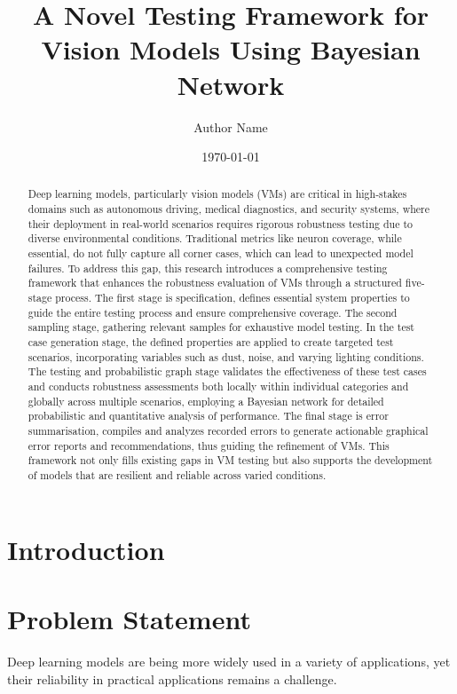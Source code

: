 \documentclass[10pt, conference, a4paper, final]{IEEEtran}
\title{ A Novel Testing Framework for Vision Models Using Bayesian Network}
\author{Author Name}
\date{\today}
\begin{document}
\maketitle

\begin{abstract}

    Deep learning models, particularly vision models (VMs) are critical in high-stakes domains such as autonomous driving, medical diagnostics, and security systems, where their deployment in real-world scenarios requires rigorous robustness testing due to diverse environmental conditions. Traditional metrics like neuron coverage, while essential, do not fully capture all corner cases, which can lead to unexpected model failures. To address this gap, this research introduces a comprehensive testing framework that enhances the robustness evaluation of VMs through a structured five-stage process. The first stage is specification, defines essential system properties to guide the entire testing process and ensure comprehensive coverage. The second sampling stage, gathering relevant samples for exhaustive model testing. In the test case generation stage, the defined properties are applied to create targeted test scenarios, incorporating variables such as dust, noise, and varying lighting conditions. The testing and probabilistic graph stage validates the effectiveness of these test cases and conducts robustness assessments both locally within individual categories and globally across multiple scenarios, employing a Bayesian network for detailed probabilistic and quantitative analysis of performance. The final stage is error summarisation, compiles and analyzes recorded errors to generate actionable graphical error reports and recommendations, thus guiding the refinement of VMs. This framework not only fills existing gaps in VM testing but also supports the development of models that are resilient and reliable across varied conditions.
\end{abstract}


\section{Introduction}

\section{Problem Statement}

Deep learning models are being more widely used in a variety of applications, yet their reliability in practical applications remains a challenge.
\end{document}
